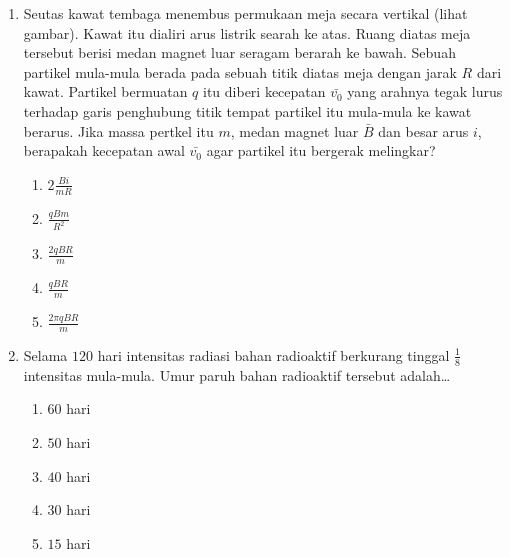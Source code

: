\documentclass[A4,12PT, english, twocolumn]{journal}
\begin{document}
\begin{enumerate}
\item Seutas kawat tembaga menembus permukaan meja secara vertikal (lihat gambar). Kawat itu dialiri arus listrik searah ke atas. Ruang diatas meja tersebut berisi medan magnet luar seragam berarah ke bawah. Sebuah partikel mula-mula berada pada sebuah titik diatas meja dengan jarak $R$ dari kawat. Partikel bermuatan $q$ itu diberi kecepatan $\bar{v_0}$ yang arahnya tegak lurus terhadap garis penghubung titik tempat partikel itu mula-mula ke kawat berarus. Jika massa pertkel itu $m$, medan magnet luar $\bar{B}$ dan besar arus $i$, berapakah kecepatan awal $\bar{v_0}$ agar partikel itu bergerak melingkar?
\begin{center}
\end{center}
    \begin{enumerate}
        \item $2\frac{Bi}{mR}$
        \item $\frac{qBm}{R^2}$
        \item $\frac{2qBR}{m}$
        \item $\frac{qBR}{m}$
        \item $\frac{2 \pi qBR}{m}$
    \end{enumerate}
 
\item Selama $120$ hari intensitas radiasi bahan radioaktif berkurang tinggal $\frac{1}{8}$ intensitas mula-mula. Umur paruh bahan radioaktif tersebut adalah\dots
    \begin{enumerate}
        \item $60$ hari
        \item $50$ hari
        \item $40$ hari
        \item $30$ hari
        \item $15$ hari
    \end{enumerate}


\end{enumerate}
\end{document}
